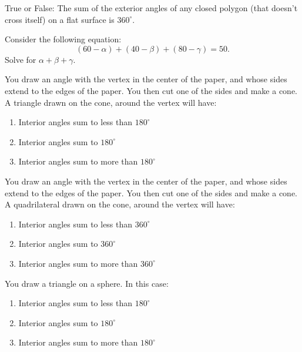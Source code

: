 \documentclass[noauthor,nooutcomes]{ximera}
\author{Claire Merriman \and Bart Snapp}
\begin{document}
\maketitle

\begin{exercise}
 True or False: The sum of the exterior angles of any closed polygon
 (that doesn't cross itself) on a flat surface is $360^\circ$.
\end{exercise}

\begin{exercise}
 Consider the following equation:
 \[
 (60-\alpha)+(40-\beta)+(80-\gamma)=50.
 \]
 Solve for $\alpha+\beta+\gamma$.
\end{exercise}






\begin{exercise}
 You draw an angle with the vertex in the center of the paper, and
 whose sides extend to the edges of the paper. You then cut one of the
 sides and make a cone. A triangle drawn on the cone, around the
 vertex will have:
 
\begin{enumerate}
 \item Interior angles sum to less than $180^\circ$
 \item Interior angles sum to $180^\circ$
 \item Interior angles sum to more than $180^\circ$
\end{enumerate}
\end{exercise}


\begin{exercise}
 You draw an angle with the vertex in the center of the paper, and
 whose sides extend to the edges of the paper. You then cut one of the
 sides and make a cone. A quadrilateral drawn on the cone, around the
 vertex will have:
 
\begin{enumerate}
 \item Interior angles sum to less than $360^\circ$
 \item Interior angles sum to $360^\circ$
 \item Interior angles sum to more than $360^\circ$
\end{enumerate}
\end{exercise}





\begin{exercise}
  You draw a triangle on a sphere. In this case:
  \begin{enumerate}
  \item Interior angles sum to less than $180^\circ$
  \item Interior angles sum to $180^\circ$
  \item Interior angles sum to more than $180^\circ$
  \end{enumerate}
\end{exercise}


\end{document}

